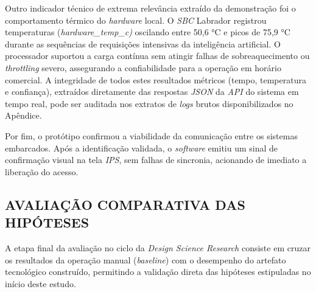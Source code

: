 Outro indicador técnico de extrema relevância extraído da demonstração foi o comportamento térmico do \textit{hardware} local. O \textit{SBC} Labrador registrou temperaturas (\textit{hardware\_temp\_c)} oscilando entre 50,6 °C e picos de 75,9 °C durante as sequências de requisições intensivas da inteligência artificial. O processador suportou a carga contínua sem atingir falhas de sobreaquecimento ou \textit{throttling} severo, assegurando a confiabilidade para a operação em horário comercial. A integridade de todos estes resultados métricos (tempo, temperatura e confiança), extraídos diretamente das respostas \textit{JSON} da \textit{API} do sistema em tempo real, pode ser auditada nos extratos de \textit{logs} brutos disponibilizados no Apêndice.  

Por fim, o protótipo confirmou a viabilidade da comunicação entre os sistemas embarcados. Após a identificação validada, o \textit{software} emitiu um sinal de confirmação visual na tela \textit{IPS}, sem falhas de sincronia, acionando de imediato a liberação do acesso.  

\subsection{AVALIAÇÃO COMPARATIVA DAS HIPÓTESES}
\label{avalicao-teste}

A etapa final da avaliação no ciclo da \textit{Design Science Research} consiste em cruzar os resultados da operação manual (\textit{baseline}) com o desempenho do artefato tecnológico construído, permitindo a validação direta das hipóteses estipuladas no início deste estudo.

